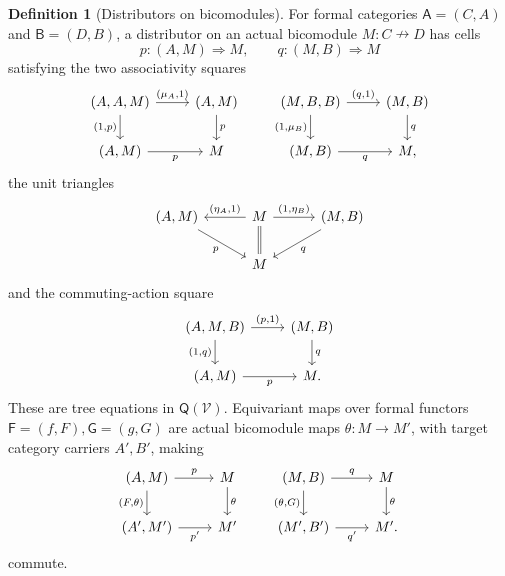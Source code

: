 \documentclass[11pt,a4paper]{article}
\theoremstyle{definition}
\newtheorem{definition}[theorem]{Definition}
\theoremstyle{remark}
\numberwithin{equation}{section}
\newcommand{\V}{\mathcal V}
\newcommand{\Q}{\mathsf Q}
\newcommand{\harr}{\mathrel{\nrightarrow}}
\newcommand{\cell}{\mathrel{\Longrightarrow}}
\begin{document}
\begin{definition}[Distributors on bicomodules]\label{def:distributor}
For formal categories $\mathsf A=(C,A)$ and $\mathsf B=(D,B)$, a
distributor on an actual bicomodule $M:C\harr D$ has cells
\[
p:(A,M)\cell M,\qquad q:(M,B)\cell M
\]
satisfying the two associativity squares
\begin{equation}\label{eq:left}
\begin{tikzcd}[column sep=2.4em]
(A,A,M) \arrow[r,"{(\mu_A,1)}"] \arrow[d,"{(1,p)}"'] &
(A,M) \arrow[d,"p"]\\
(A,M) \arrow[r,"p"'] & M
\end{tikzcd}
\qquad
\begin{tikzcd}[column sep=2.4em]
(M,B,B) \arrow[r,"{(q,1)}"] \arrow[d,"{(1,\mu_B)}"'] &
(M,B) \arrow[d,"q"]\\
(M,B) \arrow[r,"q"'] & M,
\end{tikzcd}
\end{equation}
the unit triangles
\begin{equation}\label{eq:right}
\begin{tikzcd}[column sep=3em]
(A,M) \arrow[dr,"p"'] &
M \arrow[l,"{(\eta_A,1)}"'] \arrow[r,"{(1,\eta_B)}"]
  \arrow[d,equal] &
(M,B) \arrow[dl,"q"]\\
& M &
\end{tikzcd}
\end{equation}
and the commuting-action square
\begin{equation}\label{eq:commute}
\begin{tikzcd}
(A,M,B) \arrow[r,"{(p,1)}"] \arrow[d,"{(1,q)}"'] &
(M,B) \arrow[d,"q"]\\
(A,M) \arrow[r,"p"'] & M.
\end{tikzcd}
\end{equation}
These are tree equations in $\Q(\V)$. Equivariant maps over formal
functors $\mathsf F=(f,F),\mathsf G=(g,G)$ are actual bicomodule maps
$\theta:M\to M'$, with target category carriers $A',B'$, making
\[
\begin{tikzcd}
(A,M) \arrow[r,"p"] \arrow[d,"{(F,\theta)}"'] &
M \arrow[d,"\theta"]\\
(A',M') \arrow[r,"p'"'] & M'
\end{tikzcd}
\qquad
\begin{tikzcd}
(M,B) \arrow[r,"q"] \arrow[d,"{(\theta,G)}"'] &
M \arrow[d,"\theta"]\\
(M',B') \arrow[r,"q'"'] & M'.
\end{tikzcd}
\]
commute.
\end{definition}
\end{document}
